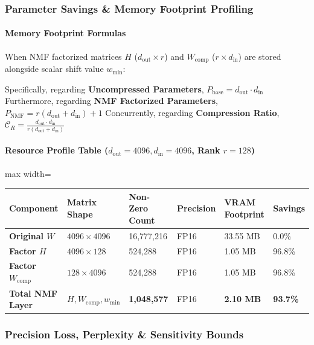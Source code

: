 \subsubsection*{Parameter Savings \& Memory Footprint Profiling}

\paragraph{Memory Footprint Formulas}
When NMF factorized matrices $H$ ($d_{\text{out}} \times r$) and $W_{\text{comp}}$ ($r \times d_{\text{in}}$) are stored alongside scalar shift value $w_{\min}$:

Specifically, regarding \textbf{Uncompressed Parameters}, $P_{\text{base}} = d_{\text{out}} \cdot d_{\text{in}}$ Furthermore, regarding \textbf{NMF Factorized Parameters}, $P_{\text{NMF}} = r(d_{\text{out}} + d_{\text{in}}) + 1$ Concurrently, regarding \textbf{Compression Ratio}, $\mathcal{C}_R = \frac{d_{\text{out}} \cdot d_{\text{in}}}{r(d_{\text{out}} + d_{\text{in}})}$


\paragraph{Resource Profile Table ($d_{\text{out}}=4096, d_{\text{in}}=4096$, Rank $r=128$)}

\begin{center}
\begin{adjustbox}{max width=\columnwidth}
\renewcommand{\arraystretch}{1.2}
\begin{tabular}{llllll}
\toprule
Component & Matrix Shape & Non-Zero Count & Precision & VRAM Footprint & Savings \\
\midrule
\textbf{Original $W$} & $4096 \times 4096$ & 16,777,216 & FP16 & 33.55 MB & 0.0\% \\
\textbf{Factor $H$} & $4096 \times 128$ & 524,288 & FP16 & 1.05 MB & 96.8\% \\
\textbf{Factor $W_{\text{comp}}$} & $128 \times 4096$ & 524,288 & FP16 & 1.05 MB & 96.8\% \\
\textbf{Total NMF Layer} & $H, W_{\text{comp}}, w_{\min}$ & \textbf{1,048,577} & FP16 & \textbf{2.10 MB} & \textbf{93.7\%} \\

\bottomrule
\end{tabular}
\end{adjustbox}
\end{center}

\subsubsection*{Precision Loss, Perplexity \& Sensitivity Bounds}

